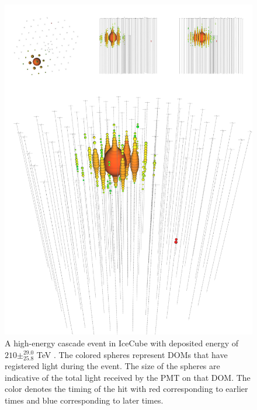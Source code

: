 \documentclass{gatech-thesis}
\begin{document}
\begin{figure}[ht]
  \begin{center}
    \includegraphics[width=1.0\textwidth,keepaspectratio]{hese_cascade_event.png}
  \end{center}
  \caption{A high-energy cascade event in IceCube with deposited energy of $210\pm^{29.0}_{25.8}$ TeV \cite{2013Sci...342E...1I}. The colored spheres represent DOMs that have registered light during the event. The size of the spheres are indicative of the total light received by the PMT on that DOM. The color denotes the timing of the hit with red corresponding to earlier times and blue corresponding to later times.}
  \label{fig:cascade}
\end{figure}
\end{document}
